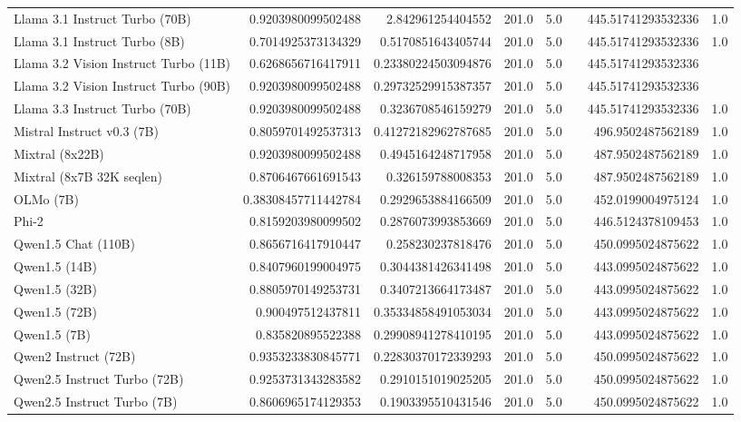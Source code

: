 \begin{table}[htp]
{\begin{tabular}{lrrrrrrr}
Llama 3.1 Instruct Turbo (70B) & 0.9203980099502488 & 2.842961254404552 & 201.0 & 5.0 &  & 445.51741293532336 & 1.0 \\
Llama 3.1 Instruct Turbo (8B) & 0.7014925373134329 & 0.5170851643405744 & 201.0 & 5.0 &  & 445.51741293532336 & 1.0 \\
Llama 3.2 Vision Instruct Turbo (11B) & 0.6268656716417911 & 0.23380224503094876 & 201.0 & 5.0 &  & 445.51741293532336 &  \\
Llama 3.2 Vision Instruct Turbo (90B) & 0.9203980099502488 & 0.29732529915387357 & 201.0 & 5.0 &  & 445.51741293532336 &  \\
Llama 3.3 Instruct Turbo (70B) & 0.9203980099502488 & 0.3236708546159279 & 201.0 & 5.0 &  & 445.51741293532336 & 1.0 \\
Mistral Instruct v0.3 (7B) & 0.8059701492537313 & 0.41272182962787685 & 201.0 & 5.0 &  & 496.9502487562189 & 1.0 \\
Mixtral (8x22B) & 0.9203980099502488 & 0.4945164248717958 & 201.0 & 5.0 &  & 487.9502487562189 & 1.0 \\
Mixtral (8x7B 32K seqlen) & 0.8706467661691543 & 0.326159788008353 & 201.0 & 5.0 &  & 487.9502487562189 & 1.0 \\
OLMo (7B) & 0.38308457711442784 & 0.2929653884166509 & 201.0 & 5.0 &  & 452.0199004975124 & 1.0 \\
Phi-2 & 0.8159203980099502 & 0.2876073993853669 & 201.0 & 5.0 &  & 446.5124378109453 & 1.0 \\
Qwen1.5 Chat (110B) & 0.8656716417910447 & 0.258230237818476 & 201.0 & 5.0 &  & 450.0995024875622 & 1.0 \\
Qwen1.5 (14B) & 0.8407960199004975 & 0.3044381426341498 & 201.0 & 5.0 &  & 443.0995024875622 & 1.0 \\
Qwen1.5 (32B) & 0.8805970149253731 & 0.3407213664173487 & 201.0 & 5.0 &  & 443.0995024875622 & 1.0 \\
Qwen1.5 (72B) & 0.900497512437811 & 0.35334858491053034 & 201.0 & 5.0 &  & 443.0995024875622 & 1.0 \\
Qwen1.5 (7B) & 0.835820895522388 & 0.29908941278410195 & 201.0 & 5.0 &  & 443.0995024875622 & 1.0 \\
Qwen2 Instruct (72B) & 0.9353233830845771 & 0.22830370172339293 & 201.0 & 5.0 &  & 450.0995024875622 & 1.0 \\
Qwen2.5 Instruct Turbo (72B) & 0.9253731343283582 & 0.2910151019025205 & 201.0 & 5.0 &  & 450.0995024875622 & 1.0 \\
Qwen2.5 Instruct Turbo (7B) & 0.8606965174129353 & 0.1903395510431546 & 201.0 & 5.0 &  & 450.0995024875622 & 1.0 \\

\end{tabular}}
\end{table}
